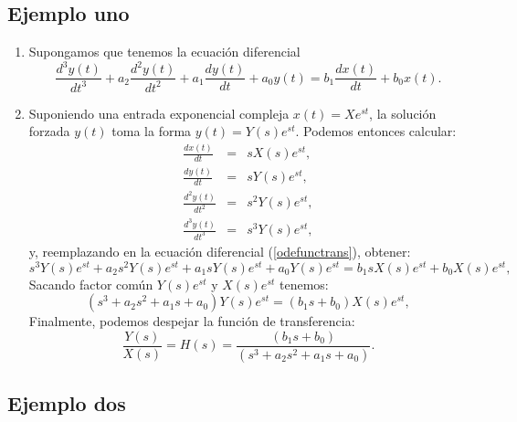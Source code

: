 \documentclass[11pt,a4paper,openany]{book}
\begin{document}
\subsection{Ejemplo uno}

\begin{enumerate}
	\item Supongamos que tenemos la ecuaci\'{o}n diferencial
	\begin{equation}
		\frac{d^{3}y\left( t\right) }{dt^{3}}+
		a_{2} \frac{d^{2}y\left( t\right) }{dt^{2}}+
		a_{1} \frac{dy\left( t\right) }{dt}+
		a_{0} y\left( t\right) =
		b_{1} \frac{dx\left( t\right) }{dt} +
		b_{0} x\left( t\right).
		\label{odefunctrans}
	\end{equation}
	
	\item Suponiendo una entrada exponencial compleja $x(t) = X e^{s t}$, la soluci\'{o}n forzada $y(t)$ toma la forma $y(t) = Y(s) e^{s t}$. Podemos entonces calcular:
	\begin{eqnarray}
		\frac{dx\left( t\right) }{dt}           &=& s X(s) e^{s t},                \\
		\frac{dy\left( t\right) }{dt}           &=& s Y(s) e^{s t},                \\
		\frac{d^{2}y\left( t\right) }{dt^{2}}   &=& s^{2} Y(s) e^{s t},            \\
		\frac{d^{3}y\left( t\right) }{dt^{3}}   &=& s^{3} Y(s) e^{s t},
	\end{eqnarray}
	y, reemplazando en la ecuaci\'{o}n diferencial (\ref{odefunctrans}), obtener:
	\begin{equation}
		s^{3} Y(s) e^{s t} + a_{2} s^{2} Y(s) e^{s t} + a_{1} s Y(s) e^{s t} + a_{0} Y(s) e^{s t} = 
		b_{1} s X(s) e^{s t} + b_{0} X(s) e^{s t},
	\end{equation}
	Sacando factor com\'{u}n $Y(s) e^{s t}$ y $X(s) e^{s t}$ tenemos:
	\begin{equation}
		\left( s^{3} + a_{2} s^{2} + a_{1} s  + a_{0} \right) Y(s)
		e^{s t} = \left( b_{1} s + b_{0} \right) X(s) e^{s t},
	\end{equation}
	Finalmente, podemos despejar la funci\'{o}n de transferencia:
	\begin{equation}
		\frac{Y(s)}{X(s)} = H(s) =  
		\frac{\left( b_{1} s + b_{0} \right)}{\left( s^{3} + a_{2} s^{2}  + a_{1} s  + a_{0} \right)}.
	\end{equation}
\end{enumerate}

\subsection{Ejemplo dos}
\end{document}
